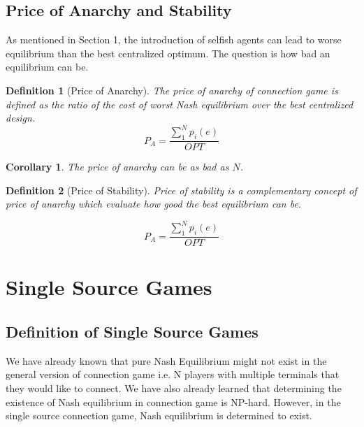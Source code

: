 \documentclass[11pt,psfig,times]{article}
\newtheorem{corollary}{Corollary}[section]
\newtheorem{definition}{Definition}[section]
\begin{document}
\subsection{Price of Anarchy and Stability}
As mentioned in Section 1, the introduction of selfish agents can lead to worse equilibrium than the best centralized optimum. The question is how bad an equilibrium can be.
\begin{definition}[Price of Anarchy] The price of anarchy of connection game is defined as the ratio of the cost of worst Nash equilibrium over the best centralized design.
	\[P_A = \dfrac{\sum_{1}^{N}p_i(e) }{OPT}\]
\end{definition}
\begin{corollary}
The price of anarchy can be as bad as \(N\).
\end{corollary}
\begin{figure}[H]
	\begin{center}
\end{center}
\end{figure}

\begin{definition}[Price of Stability] Price of stability is a complementary concept of price of anarchy which evaluate how good the best equilibrium can be. 

\[P_A = \dfrac{\sum_{1}^{N}p_i(e) }{OPT}\]
\end{definition}

\section{Single Source Games}
\subsection{Definition of Single Source Games}
We have already known that pure Nash Equilibrium might not exist in the general version of connection game i.e. N players with multiple terminals that they would like to connect. We have also already learned that determining the existence of Nash equilibrium in connection game is NP-hard. However, in the single source connection game, Nash equilibrium is determined to exist.
\end{document}

